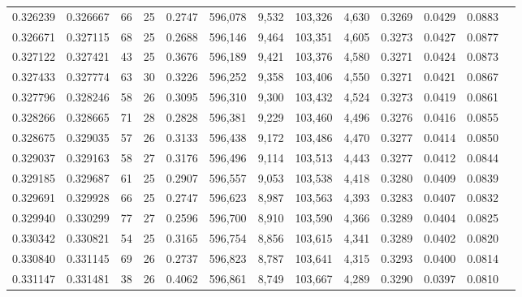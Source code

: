 \begin{tabular}{rrrrrrrrrrrrr}
0.326239 & 0.326667 &  66 &  25 &                                     0.2747 & 596,078 &   9,532 & 103,326 &   4,630 & 0.3269 & 0.0429 & 0.0883 \\
0.326671 & 0.327115 &  68 &  25 &                                     0.2688 & 596,146 &   9,464 & 103,351 &   4,605 & 0.3273 & 0.0427 & 0.0877 \\
0.327122 & 0.327421 &  43 &  25 &                                     0.3676 & 596,189 &   9,421 & 103,376 &   4,580 & 0.3271 & 0.0424 & 0.0873 \\
0.327433 & 0.327774 &  63 &  30 &                                     0.3226 & 596,252 &   9,358 & 103,406 &   4,550 & 0.3271 & 0.0421 & 0.0867 \\
0.327796 & 0.328246 &  58 &  26 &                                     0.3095 & 596,310 &   9,300 & 103,432 &   4,524 & 0.3273 & 0.0419 & 0.0861 \\
0.328266 & 0.328665 &  71 &  28 &                                     0.2828 & 596,381 &   9,229 & 103,460 &   4,496 & 0.3276 & 0.0416 & 0.0855 \\
0.328675 & 0.329035 &  57 &  26 &                                     0.3133 & 596,438 &   9,172 & 103,486 &   4,470 & 0.3277 & 0.0414 & 0.0850 \\
0.329037 & 0.329163 &  58 &  27 &                                     0.3176 & 596,496 &   9,114 & 103,513 &   4,443 & 0.3277 & 0.0412 & 0.0844 \\
0.329185 & 0.329687 &  61 &  25 &                                     0.2907 & 596,557 &   9,053 & 103,538 &   4,418 & 0.3280 & 0.0409 & 0.0839 \\
0.329691 & 0.329928 &  66 &  25 &                                     0.2747 & 596,623 &   8,987 & 103,563 &   4,393 & 0.3283 & 0.0407 & 0.0832 \\
0.329940 & 0.330299 &  77 &  27 &                                     0.2596 & 596,700 &   8,910 & 103,590 &   4,366 & 0.3289 & 0.0404 & 0.0825 \\
0.330342 & 0.330821 &  54 &  25 &                                     0.3165 & 596,754 &   8,856 & 103,615 &   4,341 & 0.3289 & 0.0402 & 0.0820 \\
0.330840 & 0.331145 &  69 &  26 &                                     0.2737 & 596,823 &   8,787 & 103,641 &   4,315 & 0.3293 & 0.0400 & 0.0814 \\
0.331147 & 0.331481 &  38 &  26 &                                     0.4062 & 596,861 &   8,749 & 103,667 &   4,289 & 0.3290 & 0.0397 & 0.0810 \\

\end{tabular}
